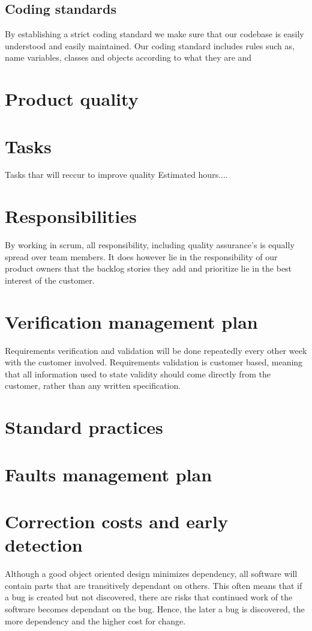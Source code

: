 \documentclass{article}
\begin{document}
\subsection{Coding standards}
By establishing a strict coding standard we make sure that our codebase is easily understood and easily maintained.
Our coding standard includes rules such as, name variables, classes and objects according to what they are and 

\section{Product quality}

\section{Tasks}
Tasks thar will reccur to improve quality
Estimated hours....
\section{Responsibilities}
By working in scrum, all responsibility, including quality assurance's is equally spread over team members.
It does however lie in the responsibility of our product owners that the backlog stories they add and prioritize lie in the best interest of the customer.
\section{Verification management plan}
Requirements verification and validation will be done repeatedly every other week with the customer involved.
Requirements validation is customer based, meaning that all information used to state validity should come directly from the customer, rather than any written specification.

\section{Standard practices}
\section{Faults management plan}
\section{Correction costs and early detection}
Although a good object oriented design minimizes dependency, all software will contain parts that are transitively dependant on others.
This often means that if a bug is created but not discovered, there are risks that continued work of the software becomes dependant on the bug.
Hence, the later a bug is discovered, the more dependency and the higher cost for change.
\end{document}
